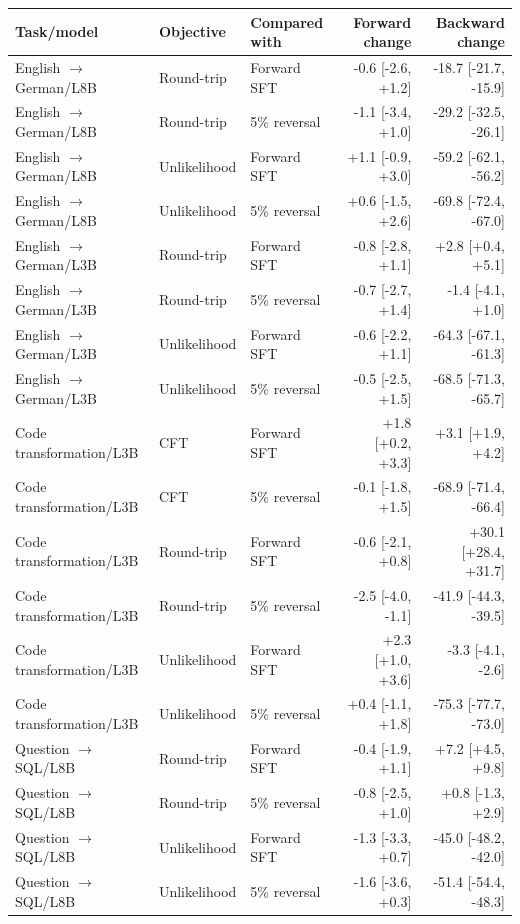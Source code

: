 \begin{table}[t]\centering\small
\begin{tabular}{lllrr}\toprule
Task/model & Objective & Compared with & Forward change & Backward change \\\midrule
English $\to$ German/L8B & Round-trip & Forward SFT & -0.6 [-2.6, +1.2] & -18.7 [-21.7, -15.9] \\
English $\to$ German/L8B & Round-trip & 5\% reversal & -1.1 [-3.4, +1.0] & -29.2 [-32.5, -26.1] \\
English $\to$ German/L8B & Unlikelihood & Forward SFT & +1.1 [-0.9, +3.0] & -59.2 [-62.1, -56.2] \\
English $\to$ German/L8B & Unlikelihood & 5\% reversal & +0.6 [-1.5, +2.6] & -69.8 [-72.4, -67.0] \\
English $\to$ German/L3B & Round-trip & Forward SFT & -0.8 [-2.8, +1.1] & +2.8 [+0.4, +5.1] \\
English $\to$ German/L3B & Round-trip & 5\% reversal & -0.7 [-2.7, +1.4] & -1.4 [-4.1, +1.0] \\
English $\to$ German/L3B & Unlikelihood & Forward SFT & -0.6 [-2.2, +1.1] & -64.3 [-67.1, -61.3] \\
English $\to$ German/L3B & Unlikelihood & 5\% reversal & -0.5 [-2.5, +1.5] & -68.5 [-71.3, -65.7] \\
Code transformation/L3B & CFT & Forward SFT & +1.8 [+0.2, +3.3] & +3.1 [+1.9, +4.2] \\
Code transformation/L3B & CFT & 5\% reversal & -0.1 [-1.8, +1.5] & -68.9 [-71.4, -66.4] \\
Code transformation/L3B & Round-trip & Forward SFT & -0.6 [-2.1, +0.8] & +30.1 [+28.4, +31.7] \\
Code transformation/L3B & Round-trip & 5\% reversal & -2.5 [-4.0, -1.1] & -41.9 [-44.3, -39.5] \\
Code transformation/L3B & Unlikelihood & Forward SFT & +2.3 [+1.0, +3.6] & -3.3 [-4.1, -2.6] \\
Code transformation/L3B & Unlikelihood & 5\% reversal & +0.4 [-1.1, +1.8] & -75.3 [-77.7, -73.0] \\
Question $\to$ SQL/L8B & Round-trip & Forward SFT & -0.4 [-1.9, +1.1] & +7.2 [+4.5, +9.8] \\
Question $\to$ SQL/L8B & Round-trip & 5\% reversal & -0.8 [-2.5, +1.0] & +0.8 [-1.3, +2.9] \\
Question $\to$ SQL/L8B & Unlikelihood & Forward SFT & -1.3 [-3.3, +0.7] & -45.0 [-48.2, -42.0] \\
Question $\to$ SQL/L8B & Unlikelihood & 5\% reversal & -1.6 [-3.6, +0.3] & -51.4 [-54.4, -48.3] \\

\end{tabular}
\end{table}
